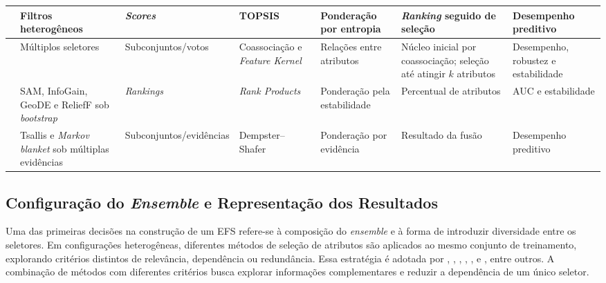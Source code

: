 \begin{table}
\begin{tabular}{|P{2.3cm}|P{2.6cm}|P{2.3cm}|P{2.8cm}|P{3.0cm}|P{3.0cm}|P{2.6cm}|}
 & Filtros heterogêneos & \textit{Scores} & TOPSIS & Ponderação por entropia & \textit{Ranking} seguido de seleção & Desempenho preditivo \\ \hline
{} & Múltiplos seletores & Subconjuntos\slash votos & Coassociação e \textit{Feature Kernel} & Relações entre atributos & Núcleo inicial por coassociação; seleção até atingir $k$ atributos & Desempenho, robustez e estabilidade \\ \hline
{} & SAM, InfoGain, GeoDE e ReliefF sob \textit{bootstrap} & \textit{Rankings} & \textit{Rank Products} & Ponderação pela estabilidade & Percentual de atributos & AUC e estabilidade \\ \hline
{} & Tsallis e \textit{Markov blanket} sob múltiplas evidências & Subconjuntos\slash evidências & Dempster--Shafer & Ponderação por evidência & Resultado da fusão & Desempenho preditivo \\ \hline
\end{tabular}
\end{table}

\subsection{Configuração do \textit{Ensemble} e Representação dos Resultados}
\label{subsec:efs-configuracao}

Uma das primeiras decisões na construção de um EFS refere-se à composição do \textit{ensemble} e à forma de introduzir diversidade entre os seletores. Em configurações heterogêneas, diferentes métodos de seleção de atributos são aplicados ao mesmo conjunto de treinamento, explorando critérios distintos de relevância, dependência ou redundância. Essa estratégia é adotada por , , , , ,  e , entre outros. A combinação de métodos com diferentes critérios busca explorar informações complementares e reduzir a dependência de um único seletor.

